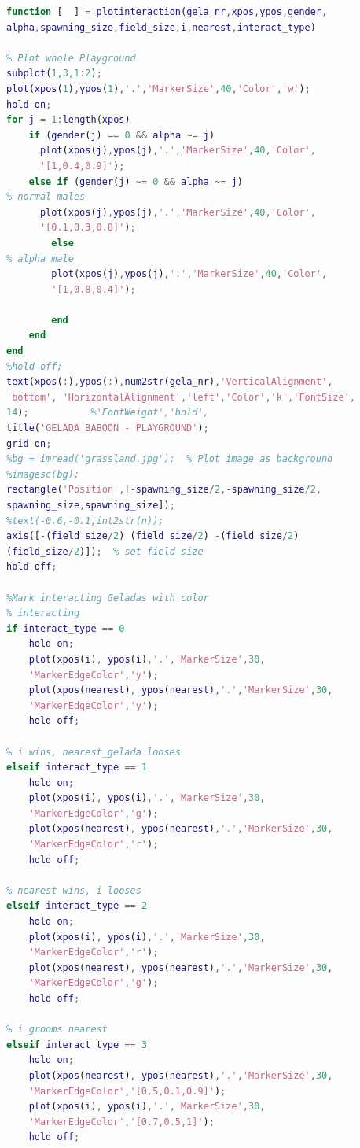 \documentclass[11pt]{article}
\begin{document}
\begin{lstlisting}[language=Matlab, backgroundcolor=\color{blue!10}, frame=single, framerule=0.1pt,commentstyle=\color{blue}, caption=function: plotinteraction.m]
function [  ] = plotinteraction(gela_nr,xpos,ypos,gender,
alpha,spawning_size,field_size,i,nearest,interact_type)

% Plot whole Playground
subplot(1,3,1:2);
plot(xpos(1),ypos(1),'.','MarkerSize',40,'Color','w');
hold on;
for j = 1:length(xpos)
    if (gender(j) == 0 && alpha ~= j)                                     % females
      plot(xpos(j),ypos(j),'.','MarkerSize',40,'Color',
      '[1,0.4,0.9]');
    else if (gender(j) ~= 0 && alpha ~= j)                  
% normal males
      plot(xpos(j),ypos(j),'.','MarkerSize',40,'Color',
      '[0.1,0.3,0.8]');
        else                                                
% alpha male
        plot(xpos(j),ypos(j),'.','MarkerSize',40,'Color',
        '[1,0.8,0.4]');    
      
        end
    end
end
%hold off;
text(xpos(:),ypos(:),num2str(gela_nr),'VerticalAlignment',
'bottom', 'HorizontalAlignment','left','Color','k','FontSize',
14);           %'FontWeight','bold',
title('GELADA BABOON - PLAYGROUND');
grid on;
%bg = imread('grassland.jpg');  % Plot image as background
%imagesc(bg);
rectangle('Position',[-spawning_size/2,-spawning_size/2,
spawning_size,spawning_size]);
%text(-0.6,-0.1,int2str(n));
axis([-(field_size/2) (field_size/2) -(field_size/2) 
(field_size/2)]);  % set field size
hold off;

%Mark interacting Geladas with color
% interacting
if interact_type == 0
    hold on;
    plot(xpos(i), ypos(i),'.','MarkerSize',30,
    'MarkerEdgeColor','y');
    plot(xpos(nearest), ypos(nearest),'.','MarkerSize',30,
    'MarkerEdgeColor','y');
    hold off;

% i wins, nearest_gelada looses
elseif interact_type == 1
    hold on;
    plot(xpos(i), ypos(i),'.','MarkerSize',30,
    'MarkerEdgeColor','g');
    plot(xpos(nearest), ypos(nearest),'.','MarkerSize',30,
    'MarkerEdgeColor','r');
    hold off;

% nearest wins, i looses
elseif interact_type == 2
    hold on;
    plot(xpos(i), ypos(i),'.','MarkerSize',30,
    'MarkerEdgeColor','r');
    plot(xpos(nearest), ypos(nearest),'.','MarkerSize',30,
    'MarkerEdgeColor','g');
    hold off;

% i grooms nearest
elseif interact_type == 3
    hold on;
    plot(xpos(nearest), ypos(nearest),'.','MarkerSize',30,
    'MarkerEdgeColor','[0.5,0.1,0.9]');
    plot(xpos(i), ypos(i),'.','MarkerSize',30,
    'MarkerEdgeColor','[0.7,0.5,1]');
    hold off;
    

\end{lstlisting}
\end{document}
